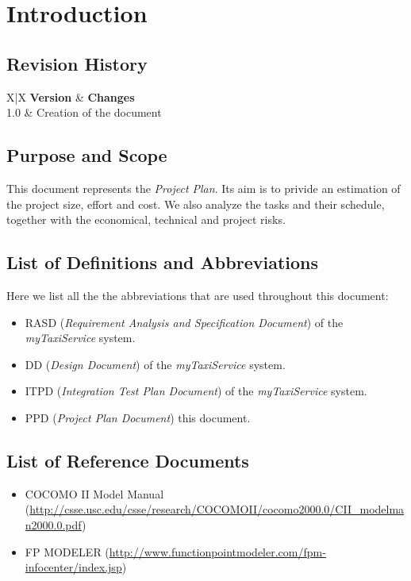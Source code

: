 \section{Introduction} %
\label{sec:introduction}

\subsection{Revision History} %
\label{sub:revision_history}
\begin{tabularx}{\textwidth}{ X|X }
	\textbf{Version} & \textbf{Changes} \\ \hline
	 {1.0} & Creation of the document \\
\end{tabularx}

\subsection{Purpose and Scope} %
\label{sub:purpose_and_scope}
This document represents the \emph{Project Plan}. Its aim is to privide an estimation of the project size, effort and cost.
We also analyze the tasks and their schedule, together with the economical, technical and project risks.


\subsection{List of Definitions and Abbreviations} %
\label{sub:definitions_and_abbreviations}
Here we list all the the abbreviations that are used throughout this document:
\begin{itemize}
	\item RASD (\emph{Requirement Analysis and Specification Document}) of the \emph{myTaxiService} system.
	\item DD (\emph{Design Document}) of the \emph{myTaxiService} system.
	\item ITPD (\emph{Integration Test Plan Document}) of the \emph{myTaxiService} system.
	\item PPD (\emph{Project Plan Document}) this document.
\end{itemize}

\subsection{List of Reference Documents} %
\label{sub:reference_documents}
\begin{itemize}
	\item COCOMO II Model Manual (\url{http://csse.usc.edu/csse/research/COCOMOII/cocomo2000.0/CII_modelman2000.0.pdf})
	\item FP MODELER (\url{http://www.functionpointmodeler.com/fpm-infocenter/index.jsp})
\end{itemize}

